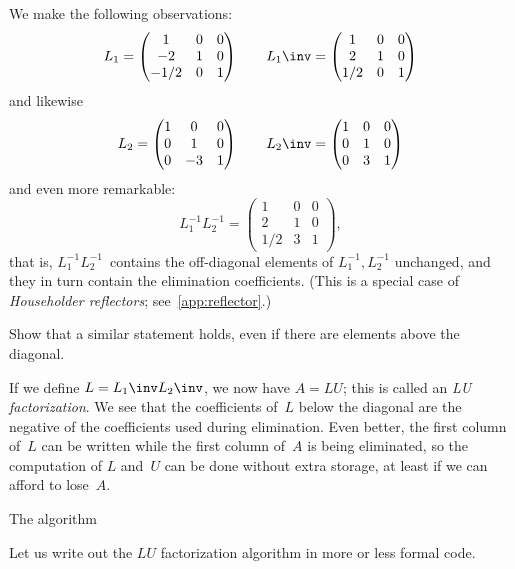 We make the following observations:
  \[ 
  L_1=\left(
    \begin{matrix}
      1&0&0\\ -2&1&0\\ -1/2&0&1
    \end{matrix}\right)\qquad
  L_1\inv=\left(
    \begin{matrix}
      1&0&0\\ 2&1&0\\ 1/2&0&1
    \end{matrix}\right)
  \]
and likewise
  \[ L_2=\left(
    \begin{matrix}
      1&0&0\\ 0&1&0\\ 0&-3&1
    \end{matrix}\right)\qquad
  L_2\inv=\left(
    \begin{matrix}
      1&0&0\\ 0&1&0\\ 0&3&1
    \end{matrix}\right)
  \]
and even more remarkable:
\[ L_1^{-1}L_2^{-1} = \left(
    \begin{matrix}
      1&0&0\\ 2&1&0\\ 1/2&3&1
    \end{matrix}\right),
\]
that is, $L_1^{-1}L_2^{-1}$~contains the off-diagonal elements of
$L_1^{-1},L_2^{-1}$ unchanged, and they in turn contain the
elimination coefficients. (This is a special case of \emph{Householder
reflectors}; see~\ref{app:reflector}.)

\begin{exercise}
  Show that a similar statement holds, even if there are elements
  above the diagonal.
\end{exercise}

If we define $L=L_1\inv L_2\inv$, we now have $A=LU$; this is called
an \emph{LU factorization}.
We see that the
coefficients of~$L$ below the diagonal
are the negative of the coefficients used during
elimination. Even better, the first column of~$L$ can be written while
the first column of~$A$ is being eliminated, so the computation of $L$
and~$U$ can be done without extra storage, at least if we can afford
to lose~$A$.

 {The algorithm}
\label{sec:lu-algorithm}

Let us write out the $LU$ factorization algorithm in more or less
formal code.

